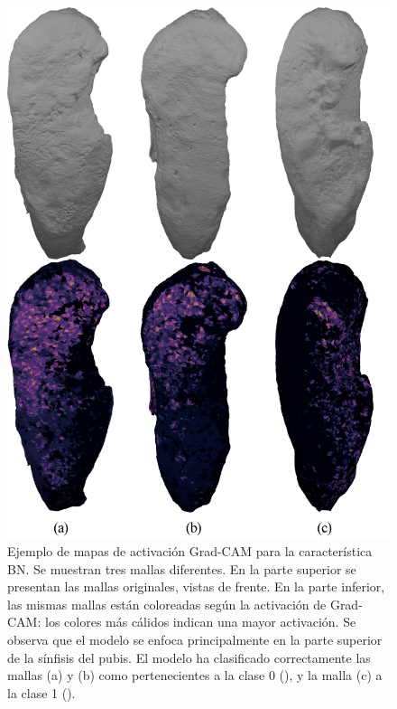 \begin{figure}[p]
    \centering
    \includegraphics[width=\linewidth]{data/grad-cam-BN-samples.png}
    \caption[Ejemplo de mapas de activación Grad-CAM para la característica BN]{Ejemplo de mapas de activación Grad-CAM para la característica BN. Se muestran tres mallas diferentes. En la parte superior se presentan las mallas originales, vistas de frente. En la parte inferior, las mismas mallas están coloreadas según la activación de Grad-CAM: los colores más cálidos indican una mayor activación. Se observa que el modelo se enfoca principalmente en la parte superior de la sínfisis del pubis. El modelo ha clasificado correctamente las mallas (a) y (b) como pertenecientes a la clase 0 (), y la malla (c) a la clase 1 ().}
    \label{fig5:grad_cam__BN_samples}
\end{figure}



